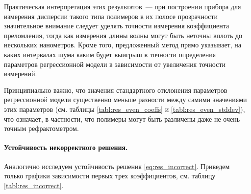 \documentclass[12pt,a4paper]{article}
\begin{document}
Практическая интерпретация этих результатов~--- при построении прибора для измерения дисперсии
такого типа полимеров в их полосе прозрачности значительное внимание следует уделять точности измерения коэффициента преломления,
тогда как измерения длины волны могут быть неточны вплоть до нескольких нанометров. Кроме того,
предложенный метод прямо указывает, на каких интервалах шума каким будет выигрыш в точности
определения параметров регрессионной модели в зависимости от увеличения точности измерений.

Принципиально важно, что значения стандартного отклонения параметров регрессионной
модели существенно меньше разности между самими значениями этих параметров
(см. таблицы \ref{tabl:res_even_coeffs} и \ref{tabl:res_even_stddev}), что означает, в частности,
что полимеры могут быть различены даже не очень точным рефрактометром.

\paragraph{Устойчивость некорректного решения.}

Аналогично исследуем устойчивость решения \eqref{eq:res_incorrect}. Приведем только графики
зависимости первых трех коэффициентов, см. таблицу \ref{tabl:res_incorrect}.
\end{document}
